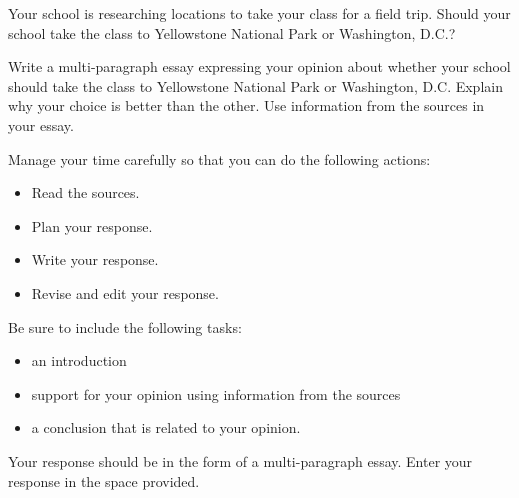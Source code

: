 \documentclass[12pt]{article}
\begin{document}
\vspace{1em}

\begin{tcolorbox}[colframe=black!60, colback=white, 
coltitle=black, colbacktitle=black!15, fonttitle=\bfseries\Large, 
title=Example Test Prompt, halign title=center, left=10pt, right=10pt, top=10pt, bottom=15pt]
Your school is researching locations to take your class for a field trip. Should your school take the class to Yellowstone National Park or Washington, D.C.?

Write a multi-paragraph essay expressing your opinion about whether your school should take the class to Yellowstone National Park or Washington, D.C. Explain why your choice is better than the other. Use information from the sources in your essay.

Manage your time carefully so that you can do the following actions:
\begin{itemize}
    \item Read the sources.
    \item Plan your response.
    \item Write your response.
    \item Revise and edit your response.

\end{itemize}
Be sure to include the following tasks:
\begin{itemize}
    \item an introduction
    \item support for your opinion using information from the sources
    \item a conclusion that is related to your opinion.

\end{itemize}
Your response should be in the form of a multi-paragraph essay. Enter your response in the space provided.
     \end{tcolorbox}

\vspace{1em}
\end{document}
